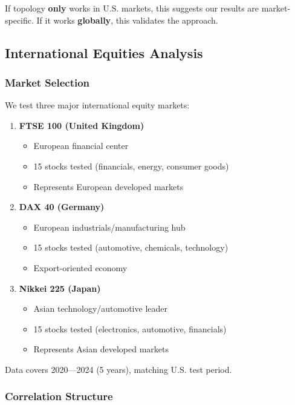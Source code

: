 If topology \textbf{only} works in U.S. markets, this suggests our results are market-specific. If it works \textbf{globally}, this validates the approach.

\subsection{International Equities Analysis}

\subsubsection{Market Selection}

We test three major international equity markets:

\begin{enumerate}
\item \textbf{FTSE 100 (United Kingdom)}
   \begin{itemize}
   \item European financial center
   \item 15 stocks tested (financials, energy, consumer goods)
   \item Represents European developed markets
   \end{itemize}

\item \textbf{DAX 40 (Germany)}
   \begin{itemize}
   \item European industrials/manufacturing hub
   \item 15 stocks tested (automotive, chemicals, technology)
   \item Export-oriented economy
   \end{itemize}

\item \textbf{Nikkei 225 (Japan)}
   \begin{itemize}
   \item Asian technology/automotive leader
   \item 15 stocks tested (electronics, automotive, financials)
   \item Represents Asian developed markets
   \end{itemize}
\end{enumerate}

Data covers 2020---2024 (5 years), matching U.S. test period.

\subsubsection{Correlation Structure}

